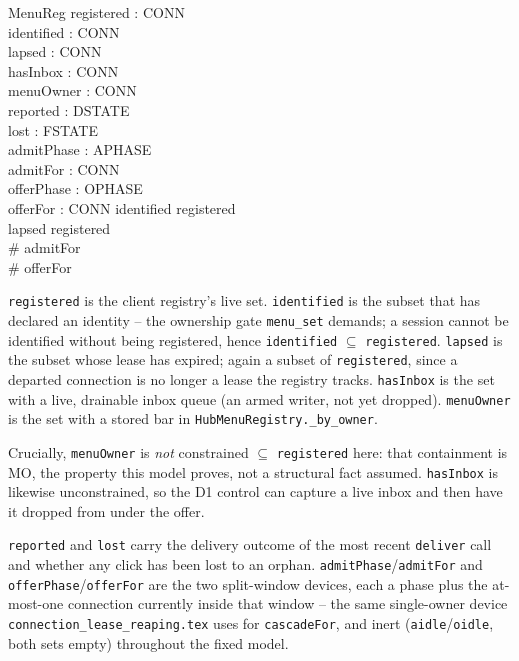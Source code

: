 \documentclass[a4paper,10pt,fleqn]{article}
\begin{document}
\begin{schema}{MenuReg}
  registered : \power CONN \\
  identified : \power CONN \\
  lapsed : \power CONN \\
  hasInbox : \power CONN \\
  menuOwner : \power CONN \\
  reported : DSTATE \\
  lost : FSTATE \\
  admitPhase : APHASE \\
  admitFor : \power CONN \\
  offerPhase : OPHASE \\
  offerFor : \power CONN
\where
  identified \subseteq registered \\
  lapsed \subseteq registered \\
  \# admitFor  \\
  \# offerFor 
\end{schema}

\texttt{registered} is the client registry's live set. \texttt{identified}
is the subset that has declared an identity -- the ownership gate
\texttt{menu\_set} demands; a session cannot be identified without being
registered, hence \texttt{identified} $\subseteq$ \texttt{registered}.
\texttt{lapsed} is the subset whose lease has expired; again a subset of
\texttt{registered}, since a departed connection is no longer a lease the
registry tracks. \texttt{hasInbox} is the set with a live, drainable inbox
queue (an armed writer, not yet dropped). \texttt{menuOwner} is the set with
a stored bar in \texttt{HubMenuRegistry.\_by\_owner}.

Crucially, \texttt{menuOwner} is \emph{not} constrained $\subseteq$
\texttt{registered} here: that containment is MO, the property this model
proves, not a structural fact assumed. \texttt{hasInbox} is likewise
unconstrained, so the D1 control can capture a live inbox and then have it
dropped from under the offer.

\texttt{reported} and \texttt{lost} carry the delivery outcome of the most
recent \texttt{deliver} call and whether any click has been lost to an
orphan. \texttt{admitPhase}/\texttt{admitFor} and
\texttt{offerPhase}/\texttt{offerFor} are the two split-window devices,
each a phase plus the at-most-one connection currently inside that window --
the same single-owner device \texttt{connection\_lease\_reaping.tex} uses
for \texttt{cascadeFor}, and inert (\texttt{aidle}/\texttt{oidle}, both sets
empty) throughout the fixed model.
\end{document}
